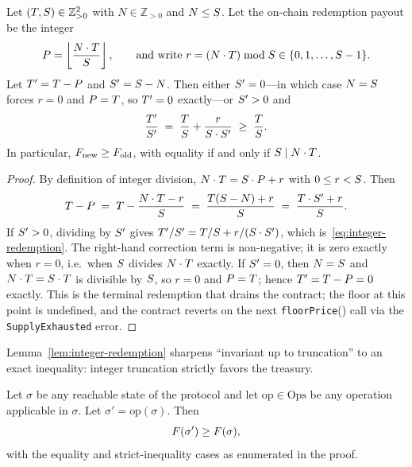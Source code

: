 \begin{lemma}
\label{lem:integer-redemption}
Let $(T, S) \in \mathbb{Z}_{> 0}^2$ with $N \in \mathbb{Z}_{> 0}$ and $N \leq S$. Let the on-chain redemption payout be the integer
\begin{equation}
P = \left\lfloor \frac{N \cdot T}{S} \right\rfloor, \qquad
\text{and write } r = (N \cdot T) \bmod S \in \{0, 1, \ldots, S-1\}.
\label{eq:redeem-payout}
\end{equation}
Let $T' = T - P$ and $S' = S - N$. Then either $S' = 0$---in which case $N = S$ forces $r = 0$ and $P = T$, so $T' = 0$ exactly---or $S' > 0$ and
\begin{equation}
\frac{T'}{S'} \;=\; \frac{T}{S} + \frac{r}{S \cdot S'} \;\geq\; \frac{T}{S}.
\label{eq:integer-redemption}
\end{equation}
In particular, $F_{\mathrm{new}} \geq F_{\mathrm{old}}$, with equality if and only if $S \mid N \cdot T$.
\end{lemma}

\begin{proof}
By definition of integer division, $N \cdot T = S \cdot P + r$ with $0 \leq r < S$. Then
\[
T - P \;=\; T - \frac{N \cdot T - r}{S} \;=\; \frac{T(S - N) + r}{S} \;=\; \frac{T \cdot S' + r}{S}.
\]
If $S' > 0$, dividing by $S'$ gives $T'/S' = T/S + r/(S \cdot S')$, which is~\eqref{eq:integer-redemption}. The right-hand correction term is non-negative; it is zero exactly when $r = 0$, i.e.\ when $S$ divides $N \cdot T$ exactly. If $S' = 0$, then $N = S$ and $N \cdot T = S \cdot T$ is divisible by $S$, so $r = 0$ and $P = T$; hence $T' = T - P = 0$ exactly. This is the terminal redemption that drains the contract; the floor at this point is undefined, and the contract reverts on the next \texttt{floorPrice}() call via the \texttt{SupplyExhausted} error.
\end{proof}

Lemma~\ref{lem:integer-redemption} sharpens ``invariant up to truncation'' to an exact inequality: integer truncation strictly favors the treasury.

\begin{theorem}
\label{thm:floor-monotonicity}
Let $\sigma$ be any reachable state of the protocol and let $\text{op} \in \mathrm{Ops}$ be any operation applicable in $\sigma$. Let $\sigma' = \text{op}(\sigma)$. Then
\begin{equation}
F(\sigma') \geq F(\sigma),
\label{eq:floor-monotone}
\end{equation}
with the equality and strict-inequality cases as enumerated in the proof.
\end{theorem}

